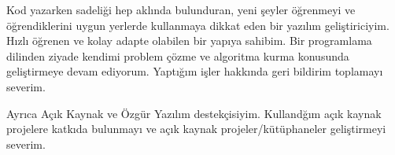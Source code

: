 
\begin{cvparagraph}
Kod yazarken sadeliği hep aklında bulunduran, yeni şeyler öğrenmeyi ve
öğrendiklerini uygun yerlerde kullanmaya dikkat eden bir yazılım geliştiriciyim.
Hızlı öğrenen ve kolay adapte olabilen bir yapıya sahibim. Bir programlama
dilinden ziyade kendimi problem çözme ve algoritma kurma konusunda geliştirmeye
devam ediyorum. Yaptığım işler hakkında geri bildirim toplamayı severim.

Ayrıca Açık Kaynak ve Özgür Yazılım destekçisiyim. Kullandğım açık kaynak
projelere katkıda bulunmayı ve açık kaynak projeler/kütüphaneler geliştirmeyi
severim.
\end{cvparagraph}
